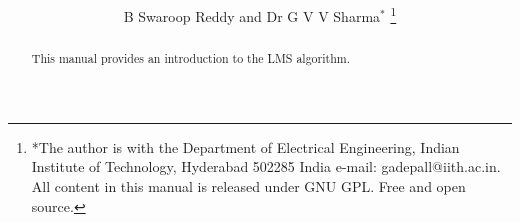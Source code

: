 \documentclass[journal,12pt,twocolumn]{IEEEtran}
\renewcommand\thesection{\arabic{section}}
\begin{document}
\let\StandardTheFigure\thefigure
\renewcommand{\thefigure}{\thesection}



\makeatletter
{}
\makeatother

\let\StandardTheFigure\thefigure
\let\StandardTheTable\thetable





\def\putbox#1#2#3{\makebox[0in][l]{\makebox[#1][l]{}\raisebox{\baselineskip}[0in][0in]{\raisebox{#2}[0in][0in]{#3}}}}
     \def\rightbox#1{\makebox[0in][r]{#1}}
     \def\centbox#1{\makebox[0in]{#1}}
     \def\topbox#1{\raisebox{-\baselineskip}[0in][0in]{#1}}
     \def\midbox#1{\raisebox{-0.5\baselineskip}[0in][0in]{#1}}

\vspace{3cm}

\title{ 
}

\author{B Swaroop Reddy and Dr G V V Sharma$^{*}$%
	\thanks{*The author is with the Department
		of Electrical Engineering, Indian Institute of Technology, Hyderabad
		502285 India e-mail:  gadepall@iith.ac.in. All content in this manual is released under GNU GPL.  Free and open source.}
	
}	

\maketitle

\tableofcontents

\bigskip

\renewcommand{\thefigure}{\theenumi}
\renewcommand{\thetable}{\theenumi}


\begin{abstract}
	
This manual provides an introduction to the LMS algorithm.
		
\end{abstract}
\end{document}
